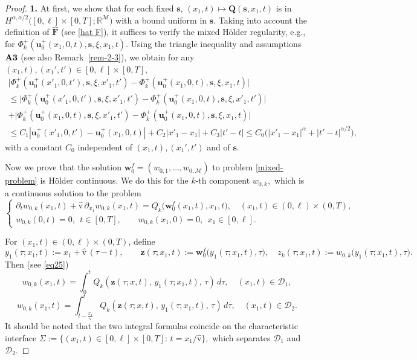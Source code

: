 \documentclass[reqno]{amsart}            %
\numberwithin{equation}{section}
\begin{document}
\begin{proof} {\bf 1.}
		At first, we show that  for each fixed $\mathbf{s}$, $(x_1,t)\mapsto \mathbf{Q}(\mathbf{s},x_1,t)$ is in $H^{\alpha,\alpha/2}\big([0,\ell]\times[0,T]; \mathbb{R}^\mathcal{M}\big)$ with a bound uniform in $\mathbf{s}.$
		Taking into account the definition of $\widehat{\mathbf {F}}$ (see \eqref{hat F}), 
		it suffices to verify the mixed Hölder regularity, e.g., for
		$\Phi_k^+(\mathbf{u}^+_0(x_1,0,t),\mathbf{s},\xi,x_1,t).$
		Using the triangle inequality and assumptions ${\bf A3}$ (see also Remark~\ref{rem-2-3}), we obtain for any $(x_1,t),(x_1',t')\in[0,\ell]\times[0,T]$, 
		\begin{multline*}
			\big| \Phi_k^+(\mathbf{u}^+_0(x'_1,0,t'),\mathbf{s},\xi,x'_1,t') - \Phi_k^+(\mathbf{u}^+_0(x_1,0,t),\mathbf{s},\xi,x_1,t)\big|
			\\
			\le
			\big| \Phi_k^+(\mathbf{u}^+_0(x'_1,0,t'),\mathbf{s},\xi,x'_1,t') - \Phi_k^+(\mathbf{u}^+_0(x_1,0,t),\mathbf{s},\xi,x'_1,t')\big|
			\\
			+
			\big| \Phi_k^+(\mathbf{u}^+_0(x_1,0,t),\mathbf{s},\xi,x'_1,t') - \Phi_k^+(\mathbf{u}^+_0(x_1,0,t),\mathbf{s},\xi,x_1,t)\big|
			\\
			\le C_1 |\mathbf{u}^+_0(x'_1,0,t') - \mathbf{u}^+_0(x_1,0,t)| + C_2 |x'_1 -x_1| + C_3 |t' - t| \le C_0 \big(|x'_1 -x_1|^\alpha + |t' - t|^{\alpha/2}\big),
		\end{multline*}
		with a constant $C_0$ independent of $(x_1,t),(x_1',t')$ and of $\mathbf{s}$.
		
		Now we prove that the solution $\mathbf{w}^f_0 = (w_{0,1},\ldots,w_{0,\mathcal{M}})$ to problem \eqref{mixed-problem} is H\"older continuous. We do this for the $k$-th component $w_{0,k},$ which is a continuous solution to the problem
		\[
		\left\{\begin{array}{l}
			\partial_t w_{0,k}(x_1,t) + \hat{\mathrm{v}} \,\partial_{x_1} w_{0,k}(x_1,t) = Q_k\big(\mathbf{w}^f_0(x_1,t),x_1,t\big), \quad (x_1,t)\in(0,\ell)\times(0,T),\\[3pt]
			w_{0,k}(0,t)=0,  \ \  t\in[0,T],\qquad w_{0,k}(x_1,0)=0, \ \  x_1\in[0,\ell].
		\end{array}\right.
		\]
		
		For $(x_1,t)\in(0,\ell)\times(0,T)$, define
		\[
		y_1(\tau;x_1,t):=x_1+\hat{\mathrm{v}}\,(\tau-t),\qquad 
		\mathbf{z}(\tau;x_1,t):=\mathbf{w}^f_0\big(y_1(\tau;x_1,t),\tau\big),\quad 
		z_k(\tau;x_1,t):=w_{0,k}\big(y_1(\tau;x_1,t),\tau\big).
		\]
		Then (see \eqref{eq25})
		\[
		w_{0,k}(x_1,t)=\int_{0}^{t} Q_k\!\left(\mathbf{z}(\tau;x,t),\,y_1(\tau;x_1,t),\,\tau\right)\,d\tau, \quad (x_1,t)\in \mathcal{D}_1,
		\]
		\[
		w_{0,k}(x_1,t)=\int_{t-\frac{x_1}{\hat{\mathrm{v}}}}^{t} Q_k\!\left(\mathbf{z}(\tau;x,t),\,y_1(\tau;x_1,t),\,\tau\right)\,d\tau, \quad (x_1,t)\in \mathcal{D}_2.
		\]
		It should be noted that the two integral formulas coincide on the characteristic interface 
		$\Sigma :=
		\{(x_1,t)\in[0,\ell]\times[0,T]:\, t= x_1/\hat{\mathrm{v}} \},
		$
		which separates $\mathcal{D}_1$ and $\mathcal{D}_2$.
		

\end{proof}
\end{document}
